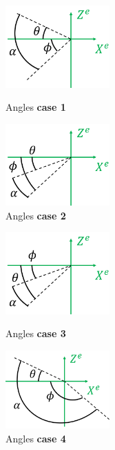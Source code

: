 \begin{figure}[!htb]
    \centering
    \begin{minipage}[b]{0.48\textwidth}
        \centering
        \includegraphics[width=4cm]{Figures/background/bet/angles-3.png}
        \caption[Angles case 1]{Angles \textbf{case 1}}
        \label{fig:ang-111}
    \end{minipage}
    \hfill
    \begin{minipage}[b]{0.48\textwidth}
        \centering
        \includegraphics[width=4cm]{Figures/background/bet/angles-1.png}
        \caption[Angles case 2]{Angles \textbf{case 2}}
        \label{fig:ang-222}
    \end{minipage}
\end{figure}
\begin{figure}[!htb]
    \begin{minipage}[b]{0.48\textwidth}
        \centering
        \includegraphics[width=4cm]{Figures/background/bet/angles-2.png}
        \caption[Angles case 3] {Angles \textbf{case 3}}
        \label{fig:ang-333}
    \end{minipage}
    \hfill
    \begin{minipage}[b]{0.48\textwidth}
        \centering
        \includegraphics[width=4cm]{Figures/background/bet/angles-4.png}
        \caption[Angles case 4] {Angles \textbf{case 4}}
        \label{fig:ang-444}
    \end{minipage}
\end{figure}


